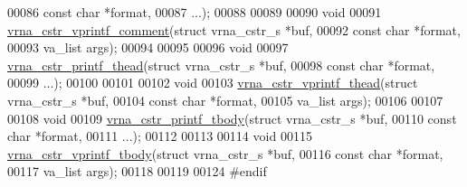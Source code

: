 \begin{DoxyCode}
00086                          \textcolor{keyword}{const} \textcolor{keywordtype}{char}         *format,
00087                          ...);
00088 
00089 
00090 \textcolor{keywordtype}{void}
00091 \mbox{\hyperlink{group__buffer__utils_ga9824160bbe620784fcca5f10c4ff247c}{vrna\_cstr\_vprintf\_comment}}(\textcolor{keyword}{struct} vrna\_cstr\_s  *buf,
00092                           \textcolor{keyword}{const} \textcolor{keywordtype}{char}          *format,
00093                           va\_list             args);
00094 
00095 
00096 \textcolor{keywordtype}{void}
00097 \mbox{\hyperlink{group__buffer__utils_gae5e551ba77b488a728d7e1700ecb0df8}{vrna\_cstr\_printf\_thead}}(\textcolor{keyword}{struct} vrna\_cstr\_s *buf,
00098                        \textcolor{keyword}{const} \textcolor{keywordtype}{char}         *format,
00099                        ...);
00100 
00101 
00102 \textcolor{keywordtype}{void}
00103 \mbox{\hyperlink{group__buffer__utils_ga6455c968e6190156267d5afdb8f211a0}{vrna\_cstr\_vprintf\_thead}}(\textcolor{keyword}{struct} vrna\_cstr\_s  *buf,
00104                         \textcolor{keyword}{const} \textcolor{keywordtype}{char}          *format,
00105                         va\_list             args);
00106 
00107 
00108 \textcolor{keywordtype}{void}
00109 \mbox{\hyperlink{group__buffer__utils_ga525e2673039eb2967cfcb118281ece3c}{vrna\_cstr\_printf\_tbody}}(\textcolor{keyword}{struct} vrna\_cstr\_s *buf,
00110                        \textcolor{keyword}{const} \textcolor{keywordtype}{char}         *format,
00111                        ...);
00112 
00113 
00114 \textcolor{keywordtype}{void}
00115 \mbox{\hyperlink{group__buffer__utils_gab10cb243cdf925c41d6d84a5a1df9760}{vrna\_cstr\_vprintf\_tbody}}(\textcolor{keyword}{struct} vrna\_cstr\_s  *buf,
00116                         \textcolor{keyword}{const} \textcolor{keywordtype}{char}          *format,
00117                         va\_list             args);
00118 
00119 
00124 \textcolor{preprocessor}{#endif}
\end{DoxyCode}
